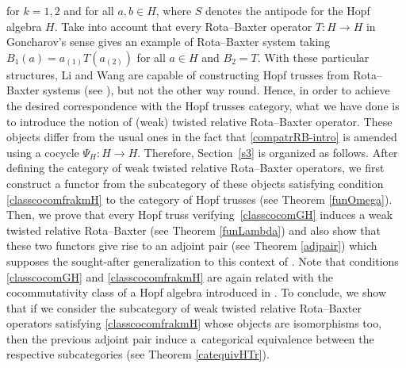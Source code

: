 \documentclass[pdftex]{sigma}
\numberwithin{equation}{section}
\begin{document}
for $k=1,2$ and for all $a,b\in H$, where $S$ denotes the antipode for the Hopf algebra $H$. Take into account that every Rota--Baxter operator $T\colon H\rightarrow H$ in Goncharov's sense gives an example of Rota--Baxter system taking $B_{1}(a)=a_{(1)}T(a_{(2)})$ for all $a\in H$ and $B_{2}=T$. With these particular structures, Li and Wang are capable of constructing Hopf trusses from Rota--Baxter systems (see \cite[Proposition 3.8]{LW2}), but not the other way round. Hence, in order to achieve the desired correspondence with the Hopf trusses category, what we have done is to introduce the notion of (weak) twisted relative Rota--Baxter operator. These objects differ from the usual ones in the fact that \eqref{compatrRB-intro} is amended using a cocycle $\Psi_{H}\colon H\rightarrow H$. Therefore, Section~\ref{s3} is organized as follows. After defining the category of weak twisted relative Rota--Baxter operators, we first construct a functor from the subcategory of these objects satisfying condition \eqref{classcocomfrakmH} to the category of Hopf trusses (see Theorem \ref{funOmega}). Then, we prove that every Hopf truss verifying~\eqref{classcocomGH} induces a weak twisted relative Rota--Baxter (see Theorem \ref{funLambda}) and also show that these two functors give rise to an adjoint pair (see Theorem \ref{adjpair}) which supposes the sought-after generalization to this context of \cite[Theorem 3.3]{LST}. Note that conditions \eqref{classcocomGH} and \eqref{classcocomfrakmH} are again related with the cocommutativity class of a Hopf algebra introduced in \cite{CCH}. To conclude, we show that if we consider the subcategory of weak twisted relative Rota--Baxter operators satisfying \eqref{classcocomfrakmH} whose objects are isomorphisms too, then the previous adjoint pair induce a~categorical equivalence between the respective subcategories (see Theorem \ref{catequivHTr}).
\end{document}
